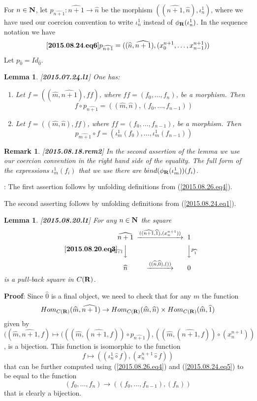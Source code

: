 \documentclass[11pt]{article}
\newenvironment{eq}{\begin{equation}}{\end{equation}}
\newenvironment{proof}{{\bf Proof}:}{\vskip 5mm }
\newtheorem{lemma}[proposition]{Lemma}
\newtheorem{remark}[proposition]{Remark}
\newcommand{\llabel}[1]{\label{#1}[{\bf #1}]}
\newcommand{\sr}{\rightarrow}
\newcommand{\nn}{{\bf N\rm}}
\newcommand{\nat}{\nn}
\newcommand{\rr}{{\bf R}}
\newcommand{\wh}{\widehat}
\newcommand{\bind}{bind}
\newcommand{\hc}{\wh{\circ}}
\begin{document}
For $n\in\nat$, let $p_{\wh{n+1}}:\wh{n+1}\sr \wh{n}$ be the morphism $((\wh{n+1},\wh{n}),\iota_n^1)$,
where we have used our coercion convention to write $\iota_n^1$ instead of $\phi_{\rr}(\iota_n^1)$. In the sequence notation we have
%
\begin{eq}\llabel{2015.08.24.eq6}
p_{\wh{n+1}}=((\wh{n},\wh{n+1}),(x_0^{n+1},\dots,x_{n-1}^{n+1}))
\end{eq}
%
Let  $p_{\wh{0}}=Id_{\wh{0}}$.
%
\begin{lemma}
\llabel{2015.07.24.l1}
One has:
%
\begin{enumerate}
\item Let $f=((\wh{m},\wh{n+1}),ff)$, where $ff=(f_0,\dots,f_n)$, be a morphism. Then 
%
$$f\circ p_{\wh{n+1}}=((\wh{m},\wh{n}),(f_0,\dots,f_{n-1}))$$
%
\item Let $f=((\wh{m},\wh{n}),ff)$, where $ff=(f_0,\dots,f_{n-1})$, be a morphism. Then 
%
$$p_{\wh{m+1}}\circ f=(\iota_m^1(f_0),\dots,\iota_m^1(f_{n-1}))$$
%
\end{enumerate}
\end{lemma}
%
\begin{remark}\rm
\llabel{2015.08.18.rem2}
In the second assertion of the lemma we use our coercion convention in the right hand side of the equality. The full form of the expressions $\iota_m^1(f_i)$ that we use there are $\bind(\phi_{\rr}(\iota_m^1))(f_i)$.
\end{remark}
%
\begin{proof}
The first assertion follows by unfolding definitions from (\ref{2015.08.26.eq4}). 

The second asserting follows by unfolding definitions from (\ref{2015.08.24.eq1}). 
\end{proof}
%
\begin{lemma}
\llabel{2015.08.20.l1}
For any $n\in\nat$ the square
%
\begin{eq}\llabel{2015.08.20.eq3}
\begin{CD}
\wh{n+1} @>((\wh{n+1},\wh{1}),(x_n^{n+1}))>> 1\\
@Vp_{\wh{n+1}}VV @VVp_{\wh{1}}V\\
\wh{n} @>((\wh{n},\wh{0}),())>> 0
\end{CD}
\end{eq}
%
is a pull-back square in $C(\rr)$.
\end{lemma}
%
\begin{proof}
Since $\wh{0}$ is a final object, we need to check that for any $m$ the function
%
$$Hom_{C(\rr)}(\wh{m},\wh{n+1})\sr Hom_{C(\rr)}(\wh{m},\wh{n})\times Hom_{C(\rr)}(\wh{m},\wh{1})$$
%
given by $((\wh{m},\wh{n+1},f)\mapsto (((\wh{m},(\wh{n+1},f))\circ p_{\wh{n+1}}),((\wh{m},(\wh{n+1},f))\circ (x_n^{n+1}))$, is a bijection. This function is isomorphic to the function
%
$$f\mapsto ((\iota_n^1\hc f),(x_n^{n+1}\hc f))$$
%
that can be further computed using (\ref{2015.08.26.eq4}) and (\ref{2015.08.24.eq5}) to be equal to the function 
%
$$(f_0,\dots,f_{n})\sr ((f_0,\dots,f_{n-1}), (f_n))$$
%
that is clearly a bijection. 
\end{proof}
\end{document}
